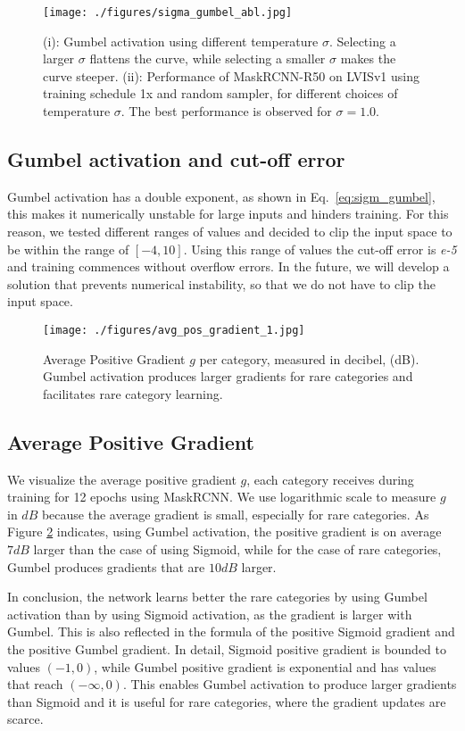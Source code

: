 \documentclass[runningheads]{llncs}
\begin{document}
\begin{figure}[t]
    \centering
    \texttt{[image: ./figures/sigma\_gumbel\_abl.jpg]}
    \caption{(i): Gumbel activation using different temperature $\sigma$. Selecting a larger $\sigma$ flattens the curve, while selecting a smaller $\sigma$ makes the curve steeper. (ii): Performance of MaskRCNN-R50 on LVISv1 using training schedule 1x and random sampler, for different choices of temperature $\sigma$. The best performance is observed for $\sigma=1.0$.}
    \label{fig:sigma_gumbel}
\end{figure}


\subsection{Gumbel activation and cut-off error}
Gumbel activation has a double exponent, as shown in Eq.~\ref{eq:sigm_gumbel}, this makes it numerically unstable for large inputs and hinders training. For this reason, we tested different ranges of values and decided to clip the input space to be within the range of $[-4,10]$. Using this range of values the cut-off error is \textit{e-5} and training commences without overflow errors. In the future, we will develop a solution that prevents numerical instability, so that we do not have to clip the input space.
\begin{figure}[t]
    \centering
    \texttt{[image: ./figures/avg\_pos\_gradient\_1.jpg]}
    \caption{Average Positive Gradient $g$ per category, measured in decibel, (dB). Gumbel activation produces larger gradients for rare categories and facilitates rare category learning.}
    \label{fig:avg_pos_grad}
\end{figure}

\subsection{Average Positive Gradient}
We visualize the average positive gradient $g$, each category receives during training for 12 epochs using MaskRCNN. We use logarithmic scale to measure $g$ in $dB$ because the average gradient is small, especially for rare categories. As Figure \ref{fig:avg_pos_grad} indicates, using Gumbel activation, the positive gradient is on average $7 dB$ larger than the case of using Sigmoid, while for the case of rare categories, Gumbel produces gradients that are $10 dB$ larger. 




In conclusion, the network learns better the rare categories by using Gumbel activation than by using Sigmoid activation, as the gradient is larger with Gumbel. This is also reflected in the formula of the positive Sigmoid gradient and the positive Gumbel gradient.
In detail, Sigmoid positive gradient is bounded to values $(-1,0)$, while Gumbel positive gradient is exponential and has values that reach $(-\infty , 0)$. This enables Gumbel activation to produce larger gradients than Sigmoid and it is useful for rare categories, where the gradient updates are scarce.
\end{document}
